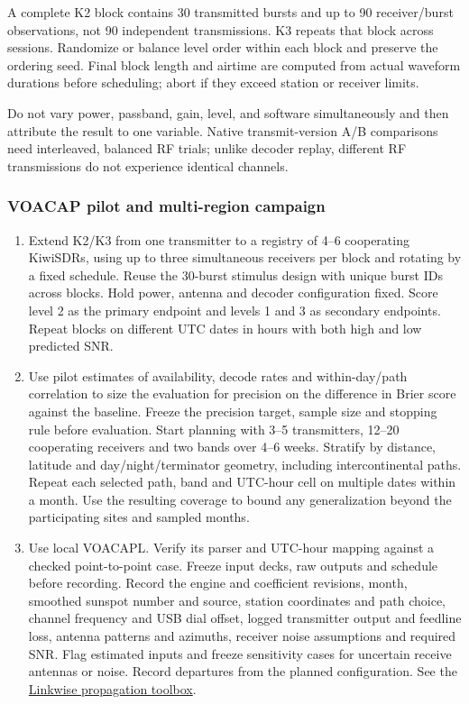 \documentclass[11pt,a4paper]{article}
\begin{document}
A complete K2 block contains 30 transmitted bursts and up to 90 receiver/burst observations, not 90 independent transmissions. K3 repeats that block across sessions. Randomize or balance level order within each block and preserve the ordering seed. Final block length and airtime are computed from actual waveform durations before scheduling; abort if they exceed station or receiver limits.

Do not vary power, passband, gain, level, and software simultaneously and then attribute the result to one variable. Native transmit-version A/B comparisons need interleaved, balanced RF trials; unlike decoder replay, different RF transmissions do not experience identical channels.

\subsubsection{VOACAP pilot and multi-region campaign}
\begin{enumerate}
\item Extend K2/K3 from one transmitter to a registry of 4--6 cooperating KiwiSDRs, using up to three simultaneous receivers per block and rotating by a fixed schedule. Reuse the 30-burst stimulus design with unique burst IDs across blocks. Hold power, antenna and decoder configuration fixed. Score level 2 as the primary endpoint and levels 1 and 3 as secondary endpoints. Repeat blocks on different UTC dates in hours with both high and low predicted SNR.
\item Use pilot estimates of availability, decode rates and within-day/path correlation to size the evaluation for precision on the difference in Brier score against the baseline. Freeze the precision target, sample size and stopping rule before evaluation. Start planning with 3--5 transmitters, 12--20 cooperating receivers and two bands over 4--6 weeks. Stratify by distance, latitude and day/night/terminator geometry, including intercontinental paths. Repeat each selected path, band and UTC-hour cell on multiple dates within a month. Use the resulting coverage to bound any generalization beyond the participating sites and sampled months.
\item Use local VOACAPL. Verify its parser and UTC-hour mapping against a checked point-to-point case. Freeze input decks, raw outputs and schedule before recording. Record the engine and coefficient revisions, month, smoothed sunspot number and source, station coordinates and path choice, channel frequency and USB dial offset, logged transmitter output and feedline loss, antenna patterns and azimuths, receiver noise assumptions and required SNR. Flag estimated inputs and freeze sensitivity cases for uncertain receive antennas or noise. Record departures from the planned configuration. See the \href{../../../rust/docs/../../reference/propagation-toolbox.md}{Linkwise propagation toolbox}.
\end{enumerate}
\end{document}
